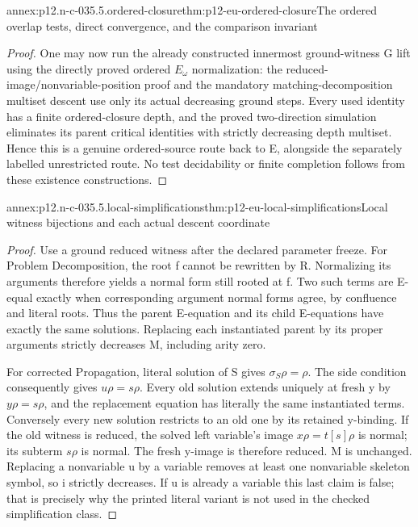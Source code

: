 \begin{annexitem}{annex:p12.n-c-035.5.ordered-closure}{thm:p12-eu-ordered-closure}{The ordered overlap tests, direct convergence, and the comparison invariant}
\begin{proof}
One may now run the already constructed innermost ground-witness G
lift using the directly proved ordered \(E_\omega\) normalization:
the reduced-image/nonvariable-position proof and the mandatory
matching-decomposition multiset descent use only its actual decreasing
ground steps. Every used identity has a finite ordered-closure depth,
and the proved two-direction simulation eliminates its parent
critical identities with strictly decreasing depth multiset. Hence
this is a genuine ordered-source route back to E, alongside the
separately labelled unrestricted route. No test decidability or
finite completion follows from these existence constructions.
\end{proof}
\end{annexitem}

\begin{annexitem}{annex:p12.n-c-035.5.local-simplifications}{thm:p12-eu-local-simplifications}{Local witness bijections and each actual descent coordinate}
\begin{proof}
Use a ground reduced witness after the declared parameter freeze.
For Problem Decomposition, the root f cannot be rewritten by R.
Normalizing its arguments therefore yields a normal form still
rooted at f. Two such terms are E-equal exactly when corresponding
argument normal forms agree, by confluence and literal roots.
Thus the parent E-equation and its child E-equations have exactly
the same solutions. Replacing each instantiated parent by its
proper arguments strictly decreases M, including arity zero.

For corrected Propagation, literal solution of S gives
\(\sigma_S\rho=\rho\). The side condition consequently gives
\(u\rho=s\rho\). Every old solution extends uniquely at fresh y
by \(y\rho=s\rho\), and the replacement equation has literally
the same instantiated terms. Conversely every new solution restricts
to an old one by its retained y-binding. If the old witness is
reduced, the solved left variable's image \(x\rho=t[s]\rho\)
is normal; its subterm \(s\rho\) is normal. The fresh y-image
is therefore reduced. M is unchanged. Replacing a nonvariable u
by a variable removes at least one nonvariable skeleton symbol,
so i strictly decreases. If u is already a variable this last
claim is false; that is precisely why the printed literal variant
is not used in the checked simplification class.


\end{proof}
\end{annexitem}
